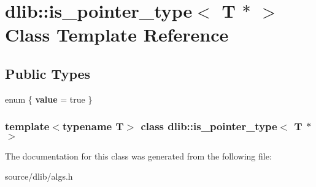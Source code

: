 \hypertarget{classdlib_1_1is__pointer__type_3_01T_01_5_01_4}{
\section{dlib::is\_\-pointer\_\-type$<$ T $\ast$ $>$ Class Template Reference}
\label{classdlib_1_1is__pointer__type_3_01T_01_5_01_4}
}
\subsection*{Public Types}
\begin{DoxyCompactItemize}
\item 
enum \{ {\bfseries value} =  true
 \}
\end{DoxyCompactItemize}
\subsubsection*{template$<$typename T$>$ class dlib::is\_\-pointer\_\-type$<$ T $\ast$ $>$}



The documentation for this class was generated from the following file:\begin{DoxyCompactItemize}
\item 
source/dlib/algs.h\end{DoxyCompactItemize}
